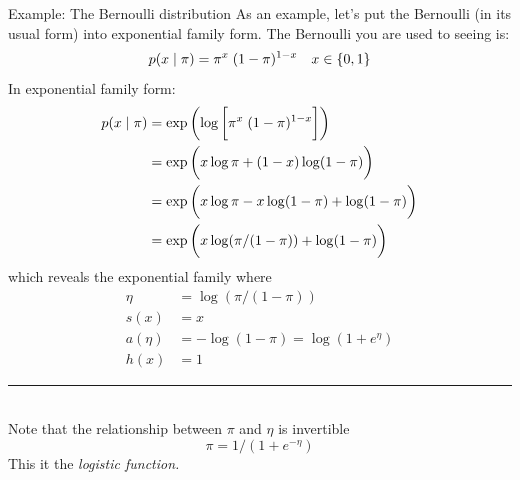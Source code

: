 \documentclass[10pt]{beamer}
\begin{document}
\begin{frame}{Example: The Bernoulli distribution}
\footnotesize
As an example, let's put the Bernoulli (in its usual form) into exponential family form.   The Bernoulli you are used to seeing is:
\[ p(x \; | \; \pi) = \pi^x \; (1-\pi)^{1-x} \quad x \in \{ {0,1} \} \] 
\pause
In exponential family form:
\begin{align*}
 p(x \; | \; \pi) &= \exp \bigg( {  \log \bigg[ {\pi^x \; (1-\pi)^{1-x} } \bigg]} \bigg) \\
 &= \exp \bigg( { x \log \pi + (1-x) \log (1-\pi)} \bigg) \\
 &= \exp \bigg( {x \log \pi - x \log (1-\pi) + \log (1-\pi)} \bigg) \\
&= \exp \bigg( {x \log (\pi/(1-\pi)) + \log (1-\pi) } \bigg) 
 \end{align*}
 which reveals the exponential family where
 \begin{align*}
\eta &= \log(\pi / (1-\pi) ) \\
s(x) &= x\\
a(\eta) &= -\log (1-\pi) = \log (1 + e^\eta) \\
h(x) &=  1
 \end{align*}
\noindent\rule{2cm}{.4pt} \\
\tiny  Note that the relationship between $\pi$ and $\eta$ is invertible
\[ \pi = 1/(1 + e^{-\eta})\] 
 This it the \it{logistic function}.


\end{frame}
\end{document}
